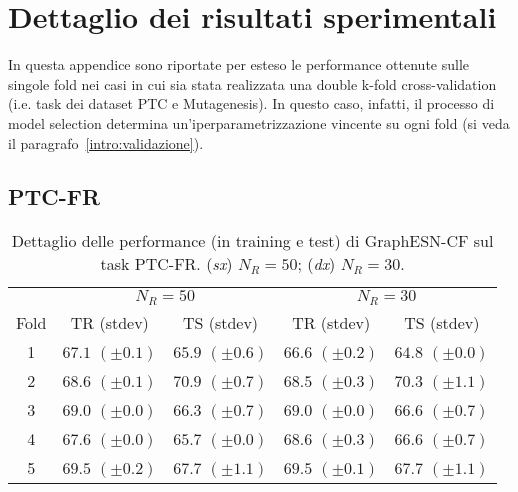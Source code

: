\chapter{Dettaglio dei risultati sperimentali}\label{app:esperimenti}
In questa appendice sono riportate per esteso le performance ottenute sulle singole fold nei casi in cui sia stata realizzata una double k-fold cross-validation (i.e. task dei dataset PTC e Mutagenesis). In questo caso, infatti, il processo di model selection determina un'iperparametrizzazione vincente su ogni fold (si veda il paragrafo~\ref{intro:validazione}).

\section{PTC-FR}

\begin{table}[tbph]
\footnotesize
\caption[Dettaglio performance: GraphESN-CF su PTC-FR]{Dettaglio delle performance (in training e test) di GraphESN-CF sul task PTC-FR. (\emph{sx}) $N_R=50$; (\emph{dx}) $N_R=30$.}
\label{app:esp:PTC-FR-CF}
\centering
\begin{tabular}{c*{4}{c}}
\toprule
& \multicolumn{2}{c}{$N_R=50$} & \multicolumn{2}{c}{$N_R=30$}\\
Fold & TR (stdev) & TS (stdev) & TR (stdev) & TS (stdev)\\
\midrule
1 & $67.1$ $(\pm 0.1)$ & $65.9$ $(\pm 0.6)$ & $66.6$ $(\pm 0.2)$ & $64.8$ $(\pm 0.0)$\\
2 & $68.6$ $(\pm 0.1)$ & $70.9$ $(\pm 0.7)$ & $68.5$ $(\pm 0.3)$ & $70.3$ $(\pm 1.1)$\\
3 & $69.0$ $(\pm 0.0)$ & $66.3$ $(\pm 0.7)$ & $69.0$ $(\pm 0.0)$ & $66.6$ $(\pm 0.7)$\\
4 & $67.6$ $(\pm 0.0)$ & $65.7$ $(\pm 0.0)$ & $68.6$ $(\pm 0.3)$ & $66.6$ $(\pm 0.7)$\\
5 & $69.5$ $(\pm 0.2)$ & $67.7$ $(\pm 1.1)$ & $69.5$ $(\pm 0.1)$ & $67.7$ $(\pm 1.1)$\\
\bottomrule
\end{tabular}
\end{table}




